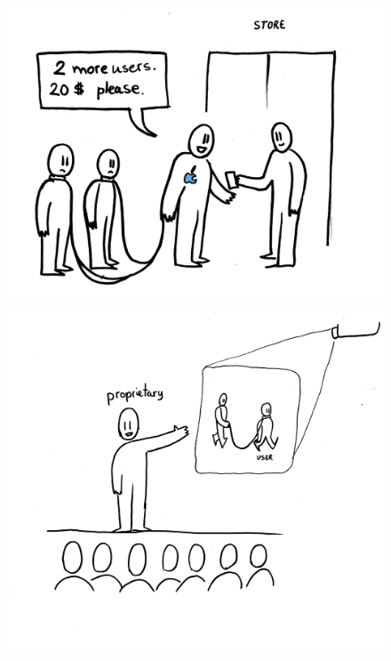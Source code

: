 \documentclass[notes,usenames,dvipsnames]{beamer}       %
\begin{document}
\begin{frame}
  \begin{figure}
    \centering
    \includegraphics[scale=0.4]{img/pr-sake-of-money}
  \end{figure}
\end{frame}

\begin{frame}
  \begin{figure}
    \centering
    \includegraphics[scale=0.5]{img/pr-no-shame}
  \end{figure}
\end{frame}
\end{document}
